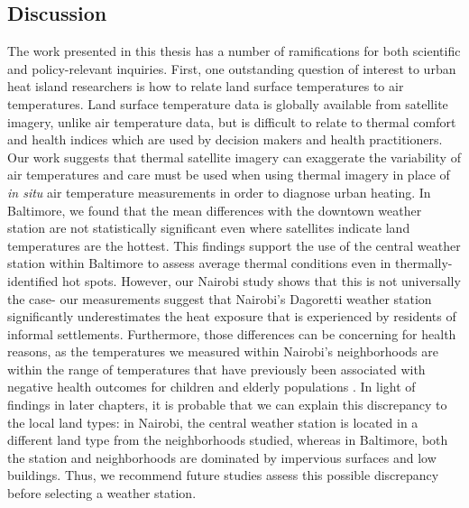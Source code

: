 \subsection{Discussion}
The work presented in this thesis has a number of ramifications for both scientific and policy-relevant inquiries.
First, one outstanding question of interest to urban heat island researchers is how to relate land surface temperatures to air temperatures. Land surface temperature data is globally available from satellite imagery, unlike air temperature data, but is difficult to relate to thermal comfort and health indices which are used by decision makers and health practitioners. 
Our work suggests that thermal satellite imagery can exaggerate the variability of air temperatures and care must be used when using thermal imagery in place of \textit{in situ} air temperature measurements in order to diagnose urban heating. 
In Baltimore, we found that the mean differences with the downtown weather station are not statistically significant even where satellites indicate land temperatures are the hottest. This findings support the use of the central weather station within Baltimore to assess average thermal conditions even in thermally-identified hot spots. 
However, our Nairobi study shows that this is not universally the case- our measurements suggest that Nairobi's Dagoretti weather station significantly underestimates the heat exposure that is experienced by residents of informal settlements. 
Furthermore, those differences can be concerning for health reasons, as 
the temperatures we measured within Nairobi's neighborhoods are within the range of temperatures that have previously been associated with negative health outcomes for children and elderly populations \citep{egondi2012}. In light of findings in later chapters, it is probable that we can explain this discrepancy to the local land types: in Nairobi, the central weather station is located in a different land type from the neighborhoods studied, whereas in Baltimore, both the station and neighborhoods are dominated by impervious surfaces and low buildings. 
Thus, we recommend future studies assess this possible discrepancy before selecting a weather station. 

